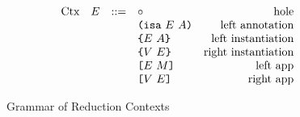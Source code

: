 \documentclass[../main.tex]{subfiles}
\begin{document}
\begin{figure*}[t]
    \centering
    \[\begin{array}{lrclr}
        \textrm{Ctx} & E & ::= & \circ{}                               & \textrm{hole}\\
                     &   &     & \texttt{(} \texttt{isa} ~ E ~ A \texttt{)}                      & \textrm{left annotation}\\
                     &   &     & \texttt{\{}E ~ A\texttt{\}}                     & \textrm{left instantiation}\\
                     &   &     & \texttt{\{}V ~ E\texttt{\}}                    & \textrm{right instantiation}\\
                     &   &     & \texttt{[} E ~ M \texttt{]}                      & \textrm{left app}\\
                     &   &     & \texttt{[} V ~ E \texttt{]}                     & \textrm{right app}\\
    \end{array}\]
    \caption{Grammar of Reduction Contexts}
    \label{fig:Plutus_core_reduction_contexts}
\end{figure*}
\end{document}
